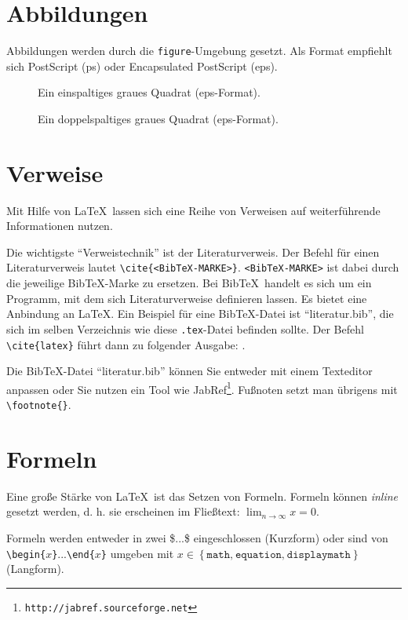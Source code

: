 \documentclass[ngerman]{ewks-latex}
\begin{document}
\section{Abbildungen}
\label{sec:figures}
Abbildungen werden durch die \texttt{figure}-Umgebung gesetzt. Als Format empfiehlt sich PostScript (ps) oder Encapsulated PostScript (eps).

\begin{figure}
\centering
{}
\caption{Ein einspaltiges graues Quadrat (eps-Format).}
\end{figure}

\begin{figure*}
\centering
{}
\caption{Ein doppelspaltiges graues Quadrat (eps-Format).}
\label{fig:doppelspaltig}
\end{figure*}

\section{Verweise}
Mit Hilfe von \LaTeX \ lassen sich eine Reihe von Verweisen auf weiterführende Informationen nutzen.

Die wichtigste "`Verweistechnik"' ist der Literaturverweis. Der Befehl für einen Literaturverweis lautet \texttt{\textbackslash cite\{<Bib\TeX-MARKE>\}}. \texttt{<Bib\TeX-MARKE>} ist dabei durch die jeweilige Bib\TeX-Marke zu ersetzen. Bei Bib\TeX \ handelt es sich um ein Programm, mit dem sich Literaturverweise definieren lassen. Es bietet eine Anbindung an \LaTeX. Ein Beispiel für eine Bib\TeX-Datei ist "`literatur.bib"', die sich im selben Verzeichnis wie diese \texttt{.tex}-Datei befinden sollte. Der Befehl \texttt{\textbackslash cite\{latex\}} führt dann zu folgender Ausgabe: \cite{latex}.

Die Bib\TeX-Datei "`literatur.bib"' können Sie entweder mit einem Texteditor anpassen oder Sie nutzen ein Tool wie JabRef\footnote{\texttt{http://jabref.sourceforge.net}}. Fußnoten setzt man übrigens mit \texttt{\textbackslash footnote\{\}}.

\section{Formeln}
Eine große Stärke von \LaTeX \ ist das Setzen von Formeln. Formeln können \textit{inline} gesetzt werden, d. h. sie erscheinen im Fließtext: $\lim_{n\rightarrow \infty}x=0$.

Formeln werden entweder in zwei \$...\$ eingeschlossen (Kurzform) oder sind von \texttt{\textbackslash begin\{$x$\}}...\texttt{\textbackslash end\{$x$\}} umgeben mit $x\in\left\{ \mathtt{math\textrm{,}\:\mathtt{equation\textrm{,}\: displaymath}}\right\}$ (Langform).
\end{document}
